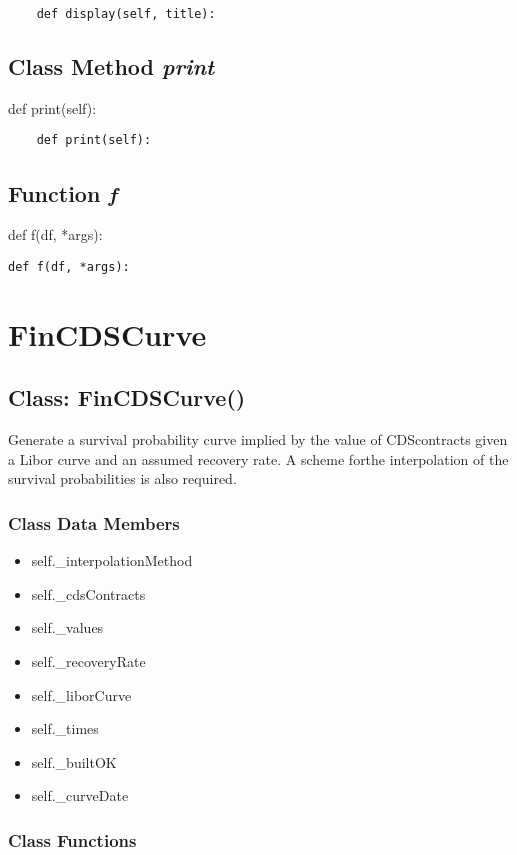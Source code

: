 \documentclass[twoside,11pt]{book}
\begin{document}
\begin{lstlisting}
    def display(self, title):
\end{lstlisting}

\subsection{Class Method {\it print}}
def print(self):

\begin{lstlisting}
    def print(self):
\end{lstlisting}

\subsection{Function {\it f}}
def f(df, *args):

\begin{lstlisting}
def f(df, *args):
\end{lstlisting}

\newpage
\section{FinCDSCurve}

\subsection{Class: FinCDSCurve()}
Generate a survival probability curve implied by the value of CDScontracts given a Libor curve and an assumed recovery rate. A scheme forthe interpolation of the survival probabilities is also required. 

\subsubsection{Class Data Members}
\begin{itemize}
\item{self.\_interpolationMethod}
\item{self.\_cdsContracts}
\item{self.\_values}
\item{self.\_recoveryRate}
\item{self.\_liborCurve}
\item{self.\_times}
\item{self.\_builtOK}
\item{self.\_curveDate}
\end{itemize}

\subsubsection{Class Functions}
\end{document}
